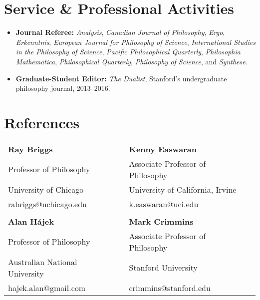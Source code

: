 \documentclass[11pt,letterpaper]{article}
\begin{document}
\section*{Service \& Professional Activities}
\begin{itemize}
    \item \textbf{Journal Referee:} \textit{Analysis}, \textit{Canadian Journal of Philosophy}, \textit{Ergo}, \textit{Erkenntnis}, \textit{European Journal for Philosophy of Science}, \textit{International Studies in the Philosophy of Science}, \textit{Pacific Philosophical Quarterly}, \textit{Philosophia Mathematica}, \textit{Philosophical Quarterly}, \textit{Philosophy of Science}, and \textit{Synthese}.
    \item \textbf{Graduate-Student Editor:} \textit{The Dualist}, Stanford's undergraduate philosophy journal, 2013--2016.
\end{itemize}

\section*{References}
\begin{tabular}{ll ll}
\textbf{Ray Briggs} & & \textbf{Kenny Easwaran} \\
Professor of Philosophy & & Associate Professor of Philosophy \\
University of Chicago & & University of California, Irvine \\
rabriggs@uchicago.edu & & k.easwaran@uci.edu \\
\\
\textbf{Alan Hájek} & & \textbf{Mark Crimmins} \\
Professor of Philosophy & & Associate Professor of Philosophy \\
Australian National University & & Stanford University \\
hajek.alan@gmail.com & & crimmins@stanford.edu \\
\end{tabular}

\end{document}
